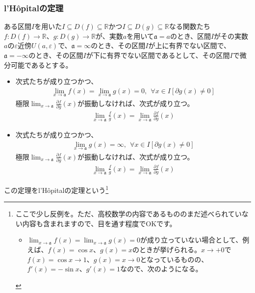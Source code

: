\documentclass[dvipdfmx]{jsarticle}
\begin{document}
\subsubsection{l'Hôpitalの定理}%
\begin{thm}[l'Hôpitalの定理]\label{4.2.2.20}
ある区間$I$を用いた$I \subseteq D(f) \subseteq \mathbb{R}$かつ$I \subseteq D(g) \subseteq \mathbb{R}$なる関数たち$f:D(f) \rightarrow \mathbb{R}$、$g:D(g) \rightarrow \mathbb{R}$が、実数$a$を用いて$\mathfrak{a} =a$のとき、区間$I$がその実数$aの\varepsilon 近傍U(a,\varepsilon)$で、$\mathfrak{a = \infty}$のとき、その区間$I$が上に有界でない区間で、$\mathfrak{a} = - \infty$のとき、その区間$I$が下に有界でない区間であるとして、その区間$I$で微分可能であるとする。
\begin{itemize}
\item
  次式たちが成り立つかつ、
\begin{align*}
\lim_{x \rightarrow \mathfrak{a}}{f(x)} = \lim_{x \rightarrow \mathfrak{a}}{g(x)} = 0,\ \ \forall x \in I\left[ \partial g(x) \neq 0 \right]
\end{align*}
極限$\lim_{x \rightarrow \mathfrak{a}}{\frac{\partial f}{\partial g}(x)}$が振動しなければ、次式が成り立つ。
\begin{align*}
\lim_{x \rightarrow \mathfrak{a}}{\frac{f}{g}(x)} = \lim_{x \rightarrow \mathfrak{a}}{\frac{\partial f}{\partial g}(x)}
\end{align*}
\item
  次式たちが成り立つかつ、
\begin{align*}
\lim_{x \rightarrow \mathfrak{a}}{g(x)} = \infty,\ \ \forall x \in I\left[ \partial g(x) \neq 0 \right]
\end{align*}
極限$\lim_{x \rightarrow \mathfrak{a}}{\frac{\partial f}{\partial g}(x)}$が振動しなければ、次式が成り立つ。
\begin{align*}
\lim_{x \rightarrow \mathfrak{a}}{\frac{f}{g}(x)} = \lim_{x \rightarrow \mathfrak{a}}{\frac{\partial f}{\partial g}(x)}
\end{align*}
\end{itemize}
この定理をl'Hôpitalの定理という\footnote{
ここで少し反例を。ただ、高校数学の内容であるもののまだ述べられていない内容も含まれますので、目を通す程度でOKです。\par
\begin{itemize}
\item
$\lim_{x \rightarrow \mathfrak{a}}{f(x)} = \lim_{x \rightarrow \mathfrak{a}}{g(x)} = 0$が成り立っていない場合として、例えば、$f(x)=\cos x$、$g(x)=x$のときが挙げられる。$x\rightarrow +0$で$f(x)=\cos x\rightarrow 1$、$g(x)=x \rightarrow 0$となっているものの、$f'(x)=-\sin x$、$g'(x)=1$なので、次のようになる。

\end{itemize}}
\end{thm}
\end{document}
